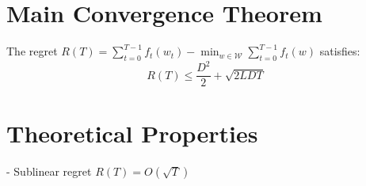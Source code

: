 \documentclass{article}
\begin{document}
\section*{Main Convergence Theorem}
The regret \( R(T) = \sum_{t=0}^{T-1} f_t(w_t) - \min_{w \in \mathcal{W}} \sum_{t=0}^{T-1} f_t(w) \) satisfies:
\[ R(T) \leq \frac{D^2}{2} + \sqrt{2LDT} \]

\section*{Theoretical Properties}
- Sublinear regret \( R(T) = O(\sqrt{T}) \)

\end{document}
